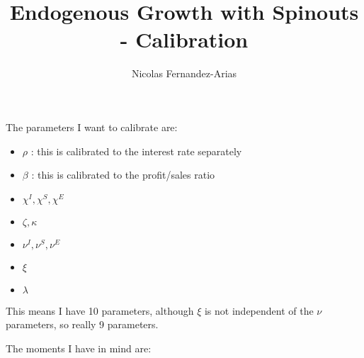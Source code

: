 \documentclass[12pt,english]{article}
\theoremstyle{remark}
\begin{document}
	
	
	
\title{Endogenous Growth with Spinouts - Calibration}
\author{Nicolas Fernandez-Arias}
\maketitle

The parameters I want to calibrate are:

\begin{itemize}
	\item $\rho$ : this is calibrated to the interest rate separately
	\item $\beta$ : this is calibrated to the profit/sales ratio
	\item $\chi^I,\chi^S,\chi^E$ 
	\item $\zeta,\kappa$
	\item $\nu^I,\nu^S,\nu^E$
	\item $\xi$
	\item $\lambda$
\end{itemize}

This means I have 10 parameters, although $\xi$ is not independent of the $\nu$ parameters, so really 9 parameters.

The moments I have in mind are:
\end{document}
